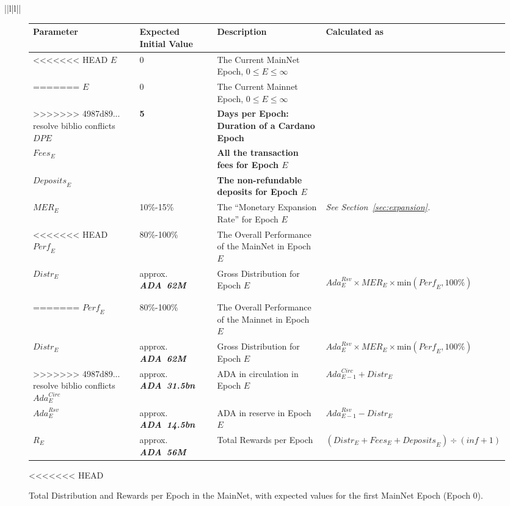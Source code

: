 \documentclass[11pt,a4paper,dvipsnames,twosided,final]{article}
\newcommand{\ada}{ADA{}}
\newcommand{\ADA}[1]{\textbf{\emph{\ada~{#1}}}}
\newcommand{\cardano}[1]{Cardano}
\begin{document}
\begin{tabular}{||l|l||}
\begin{figure}[h!]
\begin{center}
\begin{tabular}{||l|p{2.4cm}|p{6cm}|p{3.9cm}||}
  \hline \hline
\textbf{Parameter} & \textbf{Expected Initial Value} & \textbf{Description} & \textbf{Calculated as} \\\hline
<<<<<<< HEAD
$\textit{E}$ & $0$ & The Current MainNet Epoch, $0 \le E \le \infty$ & \\\hline
=======
$\textit{E}$ & $0$ & The Current Mainnet Epoch, $0 \le E \le \infty$ & \\\hline
>>>>>>> 4987d89... resolve biblio conflicts
\textbf{\color{green} $\textit{DPE}$} & \textbf{\color{green} 5} & \textbf{\color{green} Days per Epoch: Duration of a \cardano{} Epoch} & \\\hline
\textbf{\color{cyan} $\textit{Fees}_E$} & & \textbf{\color{cyan} All the transaction fees for Epoch $E$} & \\\hline
\textbf{\color{cyan} $\textit{Deposits}_E$} & & \textbf{\color{cyan} The non-refundable deposits for Epoch $E$} & \\\hline
$\textit{MER}_E$ & 10\%-15\% &  The ``Monetary Expansion Rate'' for Epoch $E$ & \emph{See Section~\ref{sec:expansion}.} \\\hline
<<<<<<< HEAD
$\textit{Perf}_E$ & 80\%-100\% &  The Overall Performance of the MainNet in Epoch $E$ &  \\\hline
$\textit{Distr}_E$ & approx. \ADA{62M} & Gross Distribution for Epoch $E$ & \begin{flushleft}$\textit{Ada}^{\textit{Rsv}}_E \times \textit{MER}_E \times \textrm{min}(\textit{Perf}_E, 100\%)$ \end{flushleft} \\\hline
=======
$\textit{Perf}_E$ & 80\%-100\% &  The Overall Performance of the Mainnet in Epoch $E$ &  \\\hline
$\textit{Distr}_E$ & approx. \ADA{62M} & Gross Distribution for Epoch $E$ & $\textit{Ada}^{\textit{Rsv}}_E \times \textit{MER}_E \times \textrm{min}(\textit{Perf}_E, 100\%)$ \\\hline
>>>>>>> 4987d89... resolve biblio conflicts
$\textit{Ada}^{\textit{Circ}}_E$ & approx. \ADA{31.5bn}  & \ada{} in circulation in Epoch $E$ & $\textit{Ada}^{\textit{Circ}}_{E-1} + \textit{Distr}_E$ \\\hline
$\textit{Ada}^{\textit{Rsv}}_E$ & approx. \ADA{14.5bn} & \ada{} in reserve in Epoch $E$ & $\textit{Ada}^{\textit{Rsv}}_{E-1} - \textit{Distr}_E$ \\\hline
$R_E$ & approx. \ADA{56M} & Total Rewards per Epoch & $ (\textit{Distr}_E + \textit{Fees}_E + \textit{Deposits}_E) \div (\textit{inf}+1)$ \\\hline
  \hline
\end{tabular}
\end{center}
<<<<<<< HEAD
\caption{Total Distribution and Rewards per Epoch in the MainNet, with expected values for the first MainNet Epoch (Epoch 0).}
\end{figure}


\end{tabular}
\end{document}

